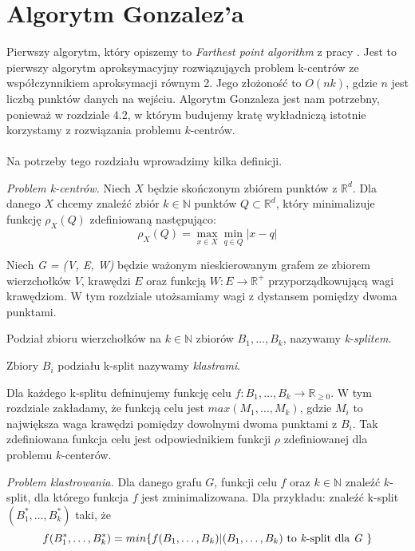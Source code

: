 \section{Algorytm Gonzalez'a}

Pierwszy algorytm, który opiszemy to \textit{Farthest point algorithm} z pracy \cite{Gonzalez1985ClusteringTM}.
Jest to pierwszy algorytm aproksymacyjny rozwiązująych problem k-centrów ze współczynnikiem aproksymacji równym 2.
Jego złożoność to $O(nk)$, gdzie $n$ jest liczbą punktów danych na wejściu.
Algorytm Gonzaleza jest nam potrzebny, ponieważ w rozdziale 4.2, w którym budujemy kratę wykładniczą istotnie korzystamy z rozwiązania problemu $k$-centrów.
\\~\\
Na potrzeby tego rozdziału wprowadzimy kilka definicji.
\begin{definition}
    \emph{Problem k-centrów.} Niech $X$ będzie skończonym zbiórem punktów z $\mathbb{R}^{d}$. 
    Dla danego $X$ chcemy znaleźć zbiór $k \in \mathbb{N}$ punktów $Q \subset \mathbb{R}^{d}$, który minimalizuje funkcję $\rho_{X}(Q)$ zdefiniowaną następująco:
    \begin{equation}
        \rho_{X}(Q) = \max_{x \in X} \min_{q \in Q} | x - q |
    \end{equation}
\end{definition}

\begin{definition}
    Niech \emph{G = (V, E, W)} będzie ważonym nieskierowanym grafem ze zbiorem wierzchołków $V$, krawędzi $E$ oraz funkcją $W: E \rightarrow \mathbb{R}^{+}$ przyporządkowującą wagi krawędziom. 
    W tym rozdziale utożsamiamy wagi z dystansem pomiędzy dwoma punktami. 
\end{definition}

\begin{definition}
    Podział zbioru wierzchołków na $k \in \mathbb{N}$ zbiorów $B_{1},\dots,B_{k}$, nazywamy \emph{k-splitem}.
\end{definition}

\begin{definition}
    Zbiory $B_{i}$ podziału k-split nazywamy \emph{klastrami}.
\end{definition}

\noindent
Dla każdego k-splitu defninujemy funkcję celu $f: B_{1},\dots,B_{k} \rightarrow \mathbb{R}_{\geq0}$.
W tym rozdziale zakładamy, że funkcją celu jest $max(M_{1},\dots,M_{k})$, gdzie $M_{i}$ to największa waga krawędzi pomiędzy dowolnymi dwoma punktami z $B_{i}$.
Tak zdefiniowana funkcja celu jest odpowiednikiem funkcji $\rho$ zdefiniowanej dla problemu $k$-centerów.
\begin{definition}
    \emph{Problem klastrowania.} Dla danego grafu $G$, funkcji celu $f$ oraz $k \in \mathbb{N}$ znaleźć $k$-split, dla którego funkcja $f$ jest zminimalizowana.
    Dla przykładu: znaleźć k-split $(B_{1}^{*},\dots,B_{k}^{*})$ taki, że 
    \begin{equation}
        f(B_{1}^{*},\dots,B_{k}^{*}) = min\{ f(B_{1},\dots,B_{k}) | (B_{1},\dots,B_{k}) \text{ to \textit{k}-split dla \textit{G} } \}
    \end{equation}
\end{definition}

